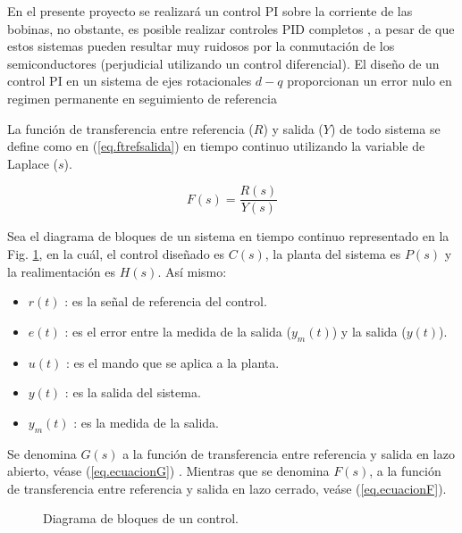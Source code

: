 \documentclass{report}
\begin{document}
En el presente proyecto se realizará un control PI sobre la corriente de las bobinas, no obstante, es posible realizar controles PID completos \cite{treintaydos}, a pesar de que estos sistemas pueden resultar muy ruidosos por la conmutación de los semiconductores (perjudicial utilizando un control diferencial). El diseño de un control PI en un sistema de ejes rotacionales $d-q$ proporcionan un error nulo en regimen permanente en seguimiento de referencia \cite{treintaytres}

La función de transferencia entre referencia ($R$) y salida ($Y$) de todo sistema se define como en (\ref{eq.ftrefsalida}) en tiempo continuo utilizando la variable de Laplace ($s$).

\begin{equation}
    F(s) = \frac{R(s)}{Y(s)} \label{eq.ftrefsalida}
\end{equation}

Sea el diagrama de bloques de un sistema en tiempo continuo representado en la Fig. \ref{fig.DiagramadebloquesControlPID}, en la cuál, el control diseñado es $C(s)$, la planta del sistema es $P(s)$ y la realimentación es $H(s)$. Así mismo:
\begin{itemize}
        \item $r(t)$ : es la señal de referencia del control.
        \item $e(t)$ : es el error entre la medida de la salida ($y_{m}(t)$) y la salida ($y(t)$).
        \item $u(t)$ : es el mando que se aplica a la planta.
        \item $y(t)$ : es la salida del sistema.
        \item $y_{m}(t)$ : es la medida de la salida.
\end{itemize}

Se denomina $G(s)$ a la función de transferencia entre referencia y salida en lazo abierto, véase (\ref{eq.ecuacionG}) . Mientras que se denomina $F(s)$, a la función de transferencia entre referencia y salida en lazo cerrado, veáse (\ref{eq.ecuacionF}).

\begin{figure}[!h]
    \begin{center}
        \end{center}
        \caption{Diagrama de bloques de un control.}
        \label{fig.DiagramadebloquesControlPID}
\end{figure}
\end{document}
